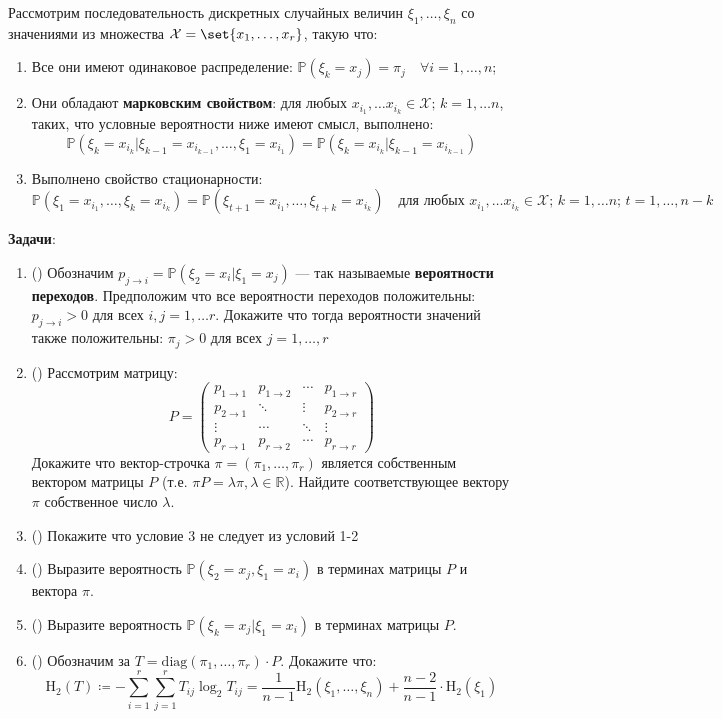 \documentclass[homework, recordsfile={../records.lua}]{practice}
\newcommand{\addpt}[1]{(\textit{\addpoints{#1}})}
\begin{document}
\begin{exercise}[subtitle=Энтропия для зависимых величин]
	Рассмотрим последовательность дискретных случайных величин $\xi_1, \ldots, \xi_n$ со значениями из множества $\mathcal{X} = \set{x_1, \ldots, x_r}$, такую что:
	\begin{enumerate}
		\item Все они имеют одинаковое распределение: $\mathbb P(\xi_k = x_j) = \pi_j \quad \forall i = 1, \ldots, n$;
		\item Они обладают \textbf{марковским свойством}: для любых $x_{i_1}, \ldots x_{i_k} \in \mathcal{X};\, k = 1, \ldots n$, таких, что условные вероятности ниже имеют смысл, выполнено:
		$$\mathbb{P}(\xi_k = x_{i_k} | \xi_{k - 1} = x_{i_{k-1}}, \ldots, \xi_{1} = x_{i_1}) = \mathbb{P}(\xi_k = x_{i_k} | \xi_{k - 1} = x_{i_{k-1}}) $$
		\item Выполнено свойство стационарности:
		$$\mathbb{P}(\xi_{1} = x_{i_1}, \ldots, \xi_{k} = x_{i_k}) = \mathbb{P}(\xi_{t+1} = x_{i_1}, \ldots, \xi_{t+k} = x_{i_k}) \quad \text{для любых $x_{i_1}, \ldots x_{i_k} \in \mathcal{X};\, k = 1, \ldots n;\, t = 1, \ldots, n - k$}$$
	\end{enumerate}

	\textbf{Задачи}:
	\begin{enumerate}
		\item \addpt{1} Обозначим $p_{j \to i} = \mathbb{P}(\xi_{2} = x_i | \xi_{1} = x_j)$ --- так называемые \textbf{вероятности переходов}. Предположим что все вероятности переходов  положительны: $p_{j \to i} > 0$ для всех $i, j = 1, \ldots r$. Докажите что тогда вероятности значений также положительны: $\pi_j > 0$ для всех $j = 1, \ldots, r$
		\item \addpt{1.5} Рассмотрим матрицу:
		$$ 
		P  = \begin{pmatrix}p_{1 \to 1} & p_{1 \to 2} & \cdots & p_{1 \to r} \\
							p_{2 \to 1} &   \ddots    & \vdots & p_{2 \to r} \\
							   \vdots   &   \cdots    & \ddots &  \vdots     \\
							p_{r \to 1} & p_{r \to 2} & \cdots & p_{r \to r}
			  \end{pmatrix}
		$$
		Докажите что вектор-строчка $\pi = (\pi_1, \ldots, \pi_r)$ является собственным вектором матрицы $P$ (т.е. $\pi P = \lambda\pi, \lambda \in \mathbb{R}$). Найдите соответствующее вектору $\pi$ собственное число $\lambda$.
		\item \addpt{1.5} Покажите что условие 3 не следует из условий 1-2
		\item \addpt{1.5} Выразите вероятность $\mathbb{P}(\xi_2 = x_j, \xi_1 = x_i)$  в терминах матрицы $P$ и вектора $\pi$.
		\item \addpt{1.5} Выразите вероятность $\mathbb{P}(\xi_k = x_j | \xi_1 = x_i)$ в терминах матрицы $P$.
		\item \addpt{1.5} Обозначим за $T = \mathrm{diag}(\pi_1, \ldots, \pi_r) \cdot P$. Докажите что:
		$$\mathrm{H}_2(T) \coloneqq  -\sum_{i = 1}^{r}\sum_{j = 1}^{r} T_{ij} \log_2 T_{ij} = \frac{1}{n-1}\mathrm{H}_2(\xi_{1}, \ldots, \xi_{n}) + \frac{n-2}{n-1} \cdot \mathrm{H}_2(\xi_1)$$
	\end{enumerate}
\end{exercise}

\PrintTotalPoints
\end{document}
